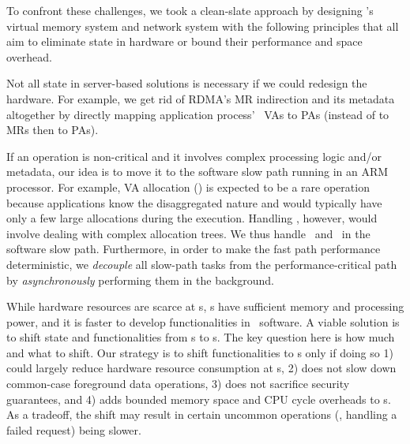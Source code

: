 To confront these challenges, we took a clean-slate approach by designing \sys's virtual memory system and network system with the following principles that all aim to eliminate state in hardware or bound their performance and space overhead.

Not all state in server-based solutions is necessary if we could redesign the hardware.
For example, we get rid of RDMA's MR indirection and its metadata altogether
by directly mapping application process' \rspace\ VAs to PAs (instead of to MRs then to PAs).

If an operation is non-critical and it involves complex processing logic and/or metadata, our idea is to move it to the software slow path running in an ARM processor.
For example, VA allocation (\alloc) is expected to be a rare operation
because applications know the disaggregated nature and would typically have only a few large allocations during the execution.
Handling \alloc, however, would involve dealing with complex allocation trees.
We thus handle \alloc\ and \sysfree\ in the software slow path.
Furthermore, in order to make the fast path performance deterministic, we {\em decouple} all slow-path tasks from the performance-critical path by {\em asynchronously} performing them in the background.



While hardware resources are scarce at \MN{}s, \CN{}s have sufficient memory and processing power, and it is faster to develop functionalities in \CN\ software.
A viable solution is to shift state and functionalities from \MN{}s to \CN{}s.
The key question here is how much and what to shift.
Our strategy is to shift functionalities to \CN{}s only if doing so 1) could largely reduce hardware resource consumption at \MN{}s, 2) does not slow down common-case foreground data operations, 3) does not sacrifice security guarantees, and 4) adds bounded memory space and CPU cycle overheads to \CN{}s.
As a tradeoff, the shift may result in certain uncommon operations (\eg, handling a failed request) being slower.

